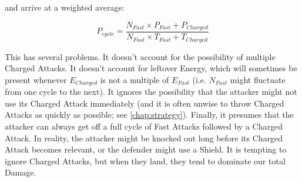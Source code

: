 and arrive at a weighted average:

\[ P_{cycle} = \frac{N_{Fast} \times P_{Fast} + P_{Charged}}{N_{Fast} \times T_{Fast} + T_{Charged}} \]

This has several problems. It doesn't account for the possibility of multiple
Charged Attacks. It doesn't account for leftover Energy, which will sometimes
be present whenever $E_{Charged}$ is not a multiple of $E_{Fast}$ (i.e. $N_{Fast}$
might fluctuate from one cycle to the next). It ignores the possibility that
the attacker might not use its Charged Attack immediately (and it is often
unwise to throw Charged Attacks as quickly as possible; see
\autoref{chap:strategy}). Finally, it presumes that the attacker can always get
off a full cycle of Fast Attacks followed by a Charged Attack. In reality, the
attacker might be knocked out long before its Charged Attack becomes relevant,
or the defender might use a Shield. It is tempting to ignore Charged Attacks,
but when they land, they tend to dominate our total Damage.
